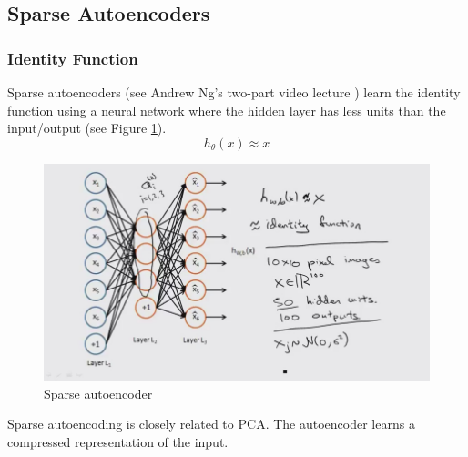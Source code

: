 \documentclass[a4paper,twoside,10pt]{article}
\begin{document}
\subsection{Sparse Autoencoders}
\subsubsection{Identity Function}
Sparse autoencoders (see Andrew Ng's two-part video lecture \citep{andrewngsparse1,andrewngsparse2}) learn the identity function using a neural network where the hidden layer has less units than the input/output (see Figure \ref{fig:sparse}).
\begin{equation*}
    h_\theta(x)\approx x
\end{equation*}
\begin{figure}[htbp]
  \begin{center}
    \includegraphics[width=.6\textwidth]{sparse}
    \caption{Sparse autoencoder\citep{andrewngsparse2}\label{fig:sparse}}
  \end{center}
\end{figure}
Sparse autoencoding is closely related to \ac{PCA}.
The autoencoder learns a compressed representation of the input.
\end{document}
